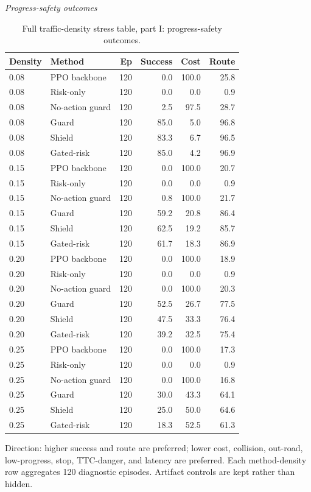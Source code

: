 \begin{table}[!htbp]
\centering
\caption{Full traffic-density stress table, part I: progress-safety outcomes.}
\label{tab_density}
\tiny
\setlength{\tabcolsep}{3.2pt}
\renewcommand{\arraystretch}{1.04}
\textit{Progress-safety outcomes}\par
\begin{tabular}{@{}llrrrr@{}}
\toprule
Density & Method & Ep & Success & Cost & Route \\
\midrule
0.08 & PPO backbone & 120 & 0.0 & 100.0 & 25.8 \\
0.08 & Risk-only & 120 & 0.0 & 0.0 & 0.9 \\
0.08 & No-action guard & 120 & 2.5 & 97.5 & 28.7 \\
0.08 & Guard & 120 & 85.0 & 5.0 & 96.8 \\
0.08 & Shield & 120 & 83.3 & 6.7 & 96.5 \\
0.08 & Gated-risk & 120 & 85.0 & 4.2 & 96.9 \\
0.15 & PPO backbone & 120 & 0.0 & 100.0 & 20.7 \\
0.15 & Risk-only & 120 & 0.0 & 0.0 & 0.9 \\
0.15 & No-action guard & 120 & 0.8 & 100.0 & 21.7 \\
0.15 & Guard & 120 & 59.2 & 20.8 & 86.4 \\
0.15 & Shield & 120 & 62.5 & 19.2 & 85.7 \\
0.15 & Gated-risk & 120 & 61.7 & 18.3 & 86.9 \\
0.20 & PPO backbone & 120 & 0.0 & 100.0 & 18.9 \\
0.20 & Risk-only & 120 & 0.0 & 0.0 & 0.9 \\
0.20 & No-action guard & 120 & 0.0 & 100.0 & 20.3 \\
0.20 & Guard & 120 & 52.5 & 26.7 & 77.5 \\
0.20 & Shield & 120 & 47.5 & 33.3 & 76.4 \\
0.20 & Gated-risk & 120 & 39.2 & 32.5 & 75.4 \\
0.25 & PPO backbone & 120 & 0.0 & 100.0 & 17.3 \\
0.25 & Risk-only & 120 & 0.0 & 0.0 & 0.9 \\
0.25 & No-action guard & 120 & 0.0 & 100.0 & 16.8 \\
0.25 & Guard & 120 & 30.0 & 43.3 & 64.1 \\
0.25 & Shield & 120 & 25.0 & 50.0 & 64.6 \\
0.25 & Gated-risk & 120 & 18.3 & 52.5 & 61.3 \\
\bottomrule
\end{tabular}
\begin{tablenotes}
\item Direction: higher success and route are preferred; lower cost, collision, out-road, low-progress, stop, TTC-danger, and latency are preferred. Each method-density row aggregates 120 diagnostic episodes. Artifact controls are kept rather than hidden.
\end{tablenotes}
\end{table}


